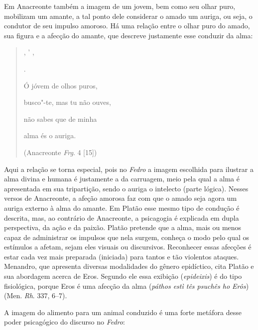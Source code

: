  

 

Em Anacreonte também a imagem de um jovem, bem como seu olhar puro,
mobilizam um amante, a tal ponto dele considerar o amado um auriga, ou
seja, o condutor de seu impulso amoroso. Há uma relação entre o olhar
puro do amado, sua figura e a afecção do amante, que descreve justamente
esse conduzir da alma:

 

\begin{quote}
   

 ,  '  ,

    

 .

 

Ó jóvem de olhos puros,

busco"-te, mas tu não ouves,

não sabes que de minha

alma és o auriga.

 

(Anacreonte \emph{Frg}. 4 [15])
\end{quote}

 

Aqui a relação se torna especial, pois no \emph{Fedro} a imagem
escolhida para ilustrar a alma divina e humana é justamente a da
carruagem, meio pela qual a alma é apresentada em sua tripartição, sendo
o auriga o intelecto (parte lógica). Nesses versos de Anacreonte, a
afeção amorosa faz com que o amado seja agora um auriga externo à alma
do amante. Em Platão esse mesmo tipo de condução é descrita, mas, ao
contrário de Anacreonte, a psicagogia é explicada em dupla perspectiva,
da ação e da paixão. Platão pretende que a alma, mais ou menos capaz de
administrar os impulsos que nela surgem, conheça o modo pelo qual os
estímulos a afetam, sejam eles visuais ou discursivos. Reconhecer essas
afecções é estar cada vez mais preparada (iniciada) para tantos e tão
violentos ataques. Menandro, que apresenta diversas modalidades do
gênero epidíctico, cita Platão e sua abordagem acerca de Eros. Segundo
ele essa exibição (\emph{epideixis}) é do tipo fisiológica, porque Eros
é uma afecção da alma (\emph{páthos estì tês psuchês ho Erôs})
(Men. \emph{Rh}. 337, 6--7).

A imagem do alimento para um animal conduzido é uma forte metáfora desse
poder psicagógico do discurso no \emph{Fedro}:

